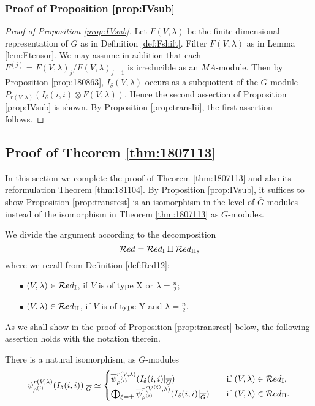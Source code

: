 \subsubsection{Proof of Proposition \ref{prop:IVsub}}
\label{subsec:1653}
\begin{proof}
[Proof of Proposition \ref{prop:IVsub}]
Let $F(V,\lambda)$ be the finite-dimensional representation of $G$
 as in Definition \ref{def:Fshift}.  
Filter $F(V,\lambda)$ as in Lemma \ref{lem:Ftensor}.  
We may assume in addition 
 that each $F^{(j)} = F(V,\lambda)_j/F(V,\lambda)_{j-1}$ is irreducible
 as an $M A$-module.  
Then by Proposition \ref{prop:180863}, 
 $I_{\delta}(V,\lambda)$ occurs as a subquotient
 of the $G$-module
 $P_{r(V,\lambda)}(I_{\delta}(i,i) \otimes F(V,\lambda))$.  
Hence the second assertion 
 of Proposition \ref{prop:IVsub} is shown.  
By Proposition \ref{prop:transIii}, 
 the first assertion follows.  
\end{proof}

\subsection{Proof of Theorem \ref{thm:1807113}}
\label{subsec:pftran1}

In this section
 we complete the proof of Theorem \ref{thm:1807113}
 and also its reformulation Theorem \ref{thm:181104}.  
By Proposition \ref{prop:IVsub}, 
 it suffices to show Proposition \ref{prop:transrest}
 is an isomorphism
 in the level of $\overline G$-modules
 instead of the isomorphism
 in Theorem \ref{thm:1807113} as $G$-modules.  



We divide the argument 
according to the decomposition 
\[
 {\mathcal{R}}ed={\mathcal{R}}ed_{\operatorname{I}} \amalg {\mathcal{R}}ed_{\operatorname{I I}}, 
\]
where we recall from Definition \ref{def:Red12}:
\begin{enumerate}
\item[$\bullet$]
$(V,\lambda) \in {\mathcal{R}}ed_{\operatorname{I}}$, 
 if $V$ is of type X or $\lambda = \frac n 2$;
\item[$\bullet$]
$(V,\lambda) \in {\mathcal{R}}ed_{\operatorname{I I}}$, 
 if $V$ is of type Y and $\lambda =\frac n 2$.  
\end{enumerate}

As we shall show in the proof of Proposition \ref{prop:transrest} below, 
 the following assertion holds with the notation therein.  
\begin{proposition}
\label{prop:transrest2}
There  is a natural isomorphism, 
 as $\overline G$-modules
\begin{equation*}
  \psi_{\rho^{(i)}}^{r(V,\lambda)}(I_{\delta}(i,i))|_{\overline G}
\simeq
\begin{cases}
  \overline \psi_{\rho^{(i)}}^{r(V,\lambda)}
 (I_{\delta}(i,i)|_{\overline G})
\quad
&\text{if $(V,\lambda)\in {\mathcal{R}}ed_{\operatorname{I}}$}, 
\\
\bigoplus_{\xi=\pm}
\overline \psi_{\rho^{(i)}}^{r(V^{(\xi)},\lambda)}
 (I_{\delta}(i,i)|_{\overline G})
\quad
&\text{if $(V,\lambda)\in {\mathcal{R}}ed_{\operatorname{I I}}$}.  
\end{cases}
\end{equation*}
\end{proposition}

